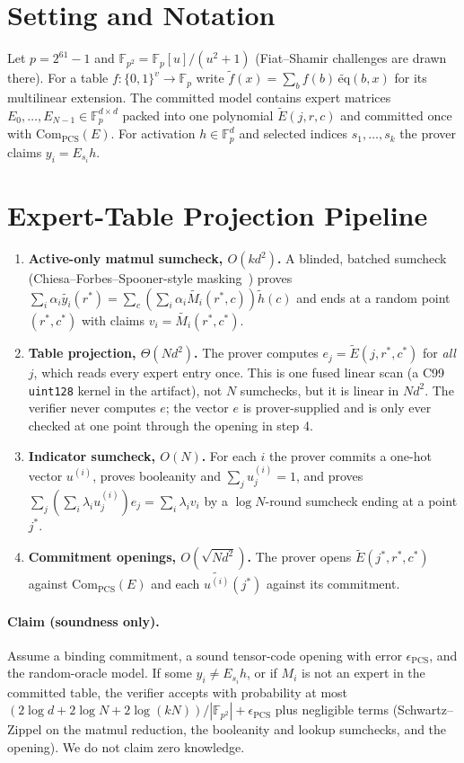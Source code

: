\documentclass[10pt,twocolumn]{article}
\newcommand{\F}{\mathbb{F}}
\newcommand{\Fp}{\mathbb{F}_p}
\newcommand{\Fptwo}{\mathbb{F}_{p^2}}
\newcommand{\eq}{\widetilde{\mathrm{eq}}}
\newcommand{\Com}{\mathrm{Com}}
\begin{document}
\section{Setting and Notation}
Let $p = 2^{61}-1$ and $\F_{p^2} = \Fp[u]/(u^2+1)$ (Fiat--Shamir challenges are drawn there). For a table $f:\{0,1\}^v\to\Fp$ write $\widetilde f(x)=\sum_b f(b)\,\eq(b,x)$ for its multilinear extension. The committed model contains expert matrices $E_0,\dots,E_{N-1}\in\Fp^{d\times d}$ packed into one polynomial $\widetilde E(j,r,c)$ and committed once with $\Com_{\text{PCS}}(E)$. For activation $h\in\Fp^d$ and selected indices $s_1,\dots,s_k$ the prover claims $y_i=E_{s_i}h$.

\section{Expert-Table Projection Pipeline}
\label{sec:lookup}
\begin{enumerate}[leftmargin=*,itemsep=2pt]
    \item \textbf{Active-only matmul sumcheck, $O(kd^2)$.} A blinded, batched sumcheck (Chiesa--Forbes--Spooner-style masking~\cite{chiesa2017zero}) proves $\sum_i\alpha_i\widetilde{y_i}(r^*)=\sum_c(\sum_i\alpha_i\widetilde{M_i}(r^*,c))\widetilde h(c)$ and ends at a random point $(r^*,c^*)$ with claims $v_i=\widetilde{M_i}(r^*,c^*)$.
    \item \textbf{Table projection, $\Theta(Nd^2)$.} The prover computes $e_j=\widetilde E(j,r^*,c^*)$ for \emph{all} $j$, which reads every expert entry once. This is one fused linear scan (a C99 \texttt{uint128} kernel in the artifact), not $N$ sumchecks, but it is linear in $Nd^2$. The verifier never computes $e$; the vector $e$ is prover-supplied and is only ever checked at one point through the opening in step 4.
    \item \textbf{Indicator sumcheck, $O(N)$.} For each $i$ the prover commits a one-hot vector $u^{(i)}$, proves booleanity and $\sum_ju^{(i)}_j=1$, and proves $\sum_j(\sum_i\lambda_iu^{(i)}_j)e_j=\sum_i\lambda_iv_i$ by a $\log N$-round sumcheck ending at a point $j^*$.
    \item \textbf{Commitment openings, $O(\sqrt{Nd^2})$.} The prover opens $\widetilde E(j^*,r^*,c^*)$ against $\Com_{\text{PCS}}(E)$ and each $\widetilde{u^{(i)}}(j^*)$ against its commitment.
\end{enumerate}

\paragraph{Claim (soundness only).} Assume a binding commitment, a sound tensor-code opening with error $\epsilon_{\text{PCS}}$, and the random-oracle model. If some $y_i\neq E_{s_i}h$, or if $M_i$ is not an expert in the committed table, the verifier accepts with probability at most $(2\log d+2\log N+2\log(kN))/|\Fptwo|+\epsilon_{\text{PCS}}$ plus negligible terms (Schwartz--Zippel on the matmul reduction, the booleanity and lookup sumchecks, and the opening). We do not claim zero knowledge.
\end{document}
